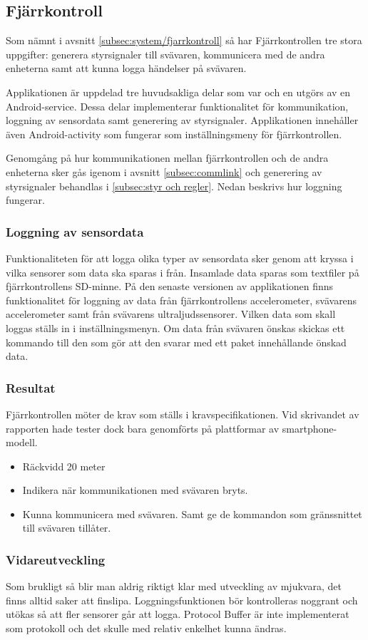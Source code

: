 \subsection{Fjärrkontroll}
Som nämnt i avsnitt \ref{subsec:system/fjarrkontroll} så har Fjärrkontrollen tre
stora uppgifter: generera styrsignaler till svävaren, kommunicera med de andra
enheterna samt att kunna logga händelser på svävaren.

Applikationen är uppdelad tre huvudsakliga delar som var och en utgörs av en
Android-service. Dessa delar implementerar funktionalitet för kommunikation,
loggning av sensordata samt generering av styrsignaler. Applikationen innehåller
även Android-activity som fungerar som inställningsmeny för fjärrkontrollen.

Genomgång på hur kommunikationen mellan fjärrkontrollen och de andra enheterna
sker gås igenom i avsnitt \ref{subsec:commlink} och generering av
styrsignaler behandlas i \ref{subsec:styr och regler}. Nedan beskrivs hur
loggning fungerar.

\subsubsection{Loggning av sensordata}
Funktionaliteten för att logga olika typer av sensordata sker genom att kryssa
i vilka sensorer som data ska sparas i från. Insamlade data sparas som textfiler
på fjärrkontrollens SD-minne.
På den senaste versionen av applikationen finns funktionalitet för loggning av
data från fjärrkontrollens accelerometer, svävarens accelerometer samt från
svävarens ultraljudssensorer. Vilken data som skall loggas ställs in i
inställningsmenyn. Om data från svävaren önskas skickas ett kommando till den
som gör att den svarar med ett paket innehållande önskad data.

\subsubsection{Resultat}
Fjärrkontrollen möter de krav som ställs i kravspecifikationen. Vid skrivandet
av rapporten hade tester dock bara genomförts på plattformar av
smartphone-modell.

\begin {itemize}
\item Räckvidd 20 meter
\item Indikera när kommunikationen med svävaren bryts.
\item Kunna kommunicera med svävaren. Samt ge de kommandon som gränssnittet till
svävaren tillåter.
\end {itemize}

\subsubsection{Vidareutveckling}
Som brukligt så blir man aldrig riktigt klar med utveckling av mjukvara, det
finns alltid saker att finslipa. Loggningsfunktionen bör kontrolleras noggrant
och utökas så att fler sensorer går att logga. Protocol Buffer är inte
implementerat som protokoll och det skulle med relativ enkelhet kunna ändras.
